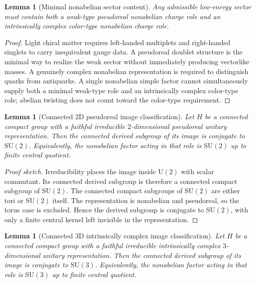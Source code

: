 \documentclass[11pt]{article}
\newtheorem{lemma}[theorem]{Lemma}
\newcommand{\SU}{\mathrm{SU}}
\newcommand{\U}{\mathrm{U}}
\begin{document}
\begin{lemma}[Minimal nonabelian sector content]\label{lem:mincontent}
Any admissible low-energy sector must contain both a weak-type pseudoreal nonabelian charge role and an intrinsically complex color-type nonabelian charge role.
\end{lemma}

\begin{proof}
Light chiral matter requires left-handed multiplets and right-handed singlets to carry inequivalent gauge data. A pseudoreal doublet structure is the minimal way to realize the weak sector without immediately producing vectorlike masses. A genuinely complex nonabelian representation is required to distinguish quarks from antiquarks. A single nonabelian simple factor cannot simultaneously supply both a minimal weak-type role and an intrinsically complex color-type role; abelian twisting does not count toward the color-type requirement.
\end{proof}

\begin{lemma}[Connected 2D pseudoreal image classification]\label{lem:su2class}
Let $H$ be a connected compact group with a faithful irreducible $2$-dimensional pseudoreal unitary representation. Then the connected derived subgroup of its image is conjugate to $\SU(2)$. Equivalently, the nonabelian factor acting in that role is $\SU(2)$ up to finite central quotient.
\end{lemma}

\begin{proof}[Proof sketch]
Irreducibility places the image inside $\U(2)$ with scalar commutant. Its connected derived subgroup is therefore a connected compact subgroup of $\SU(2)$. The connected compact subgroups of $\SU(2)$ are either tori or $\SU(2)$ itself. The representation is nonabelian and pseudoreal, so the torus case is excluded. Hence the derived subgroup is conjugate to $\SU(2)$, with only a finite central kernel left invisible in the representation.
\end{proof}

\begin{lemma}[Connected 3D intrinsically complex image classification]\label{lem:su3class}
Let $H$ be a connected compact group with a faithful irreducible intrinsically complex $3$-dimensional unitary representation. Then the connected derived subgroup of its image is conjugate to $\SU(3)$. Equivalently, the nonabelian factor acting in that role is $\SU(3)$ up to finite central quotient.
\end{lemma}
\end{document}
